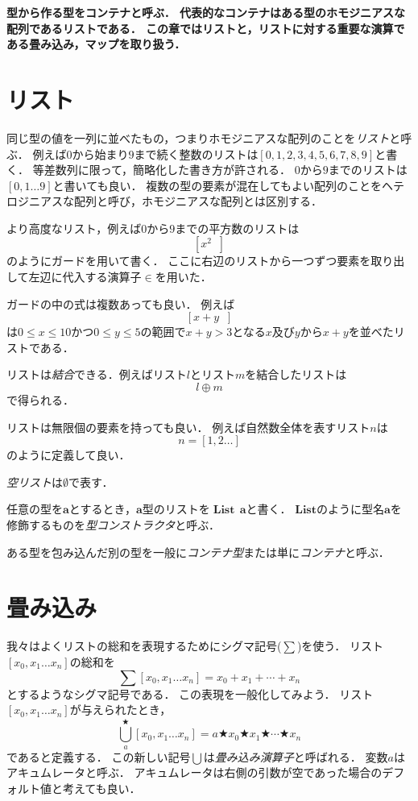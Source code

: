 \documentclass[twocolumn]{jsbook}
\newcommand{\keyword}[1]{\emph{#1}}
\newenvironment{leader}{\begingroup\bf}{\endgroup}
\newcommand{\typename}[1]{\mathbf{#1}}
\newcommand{\typeconstructor}[2]{\mathop{#1}\,#2}
\newcommand{\typelist}{\typename{List}}
\newcommand{\constantempty}{\emptyset}
\newcommand{\binaryg}{>}
\newcommand{\binarylistappend}{\oplus}
\newcommand{\listtype}[1]{\left[#1\right]}
\newcommand{\guard}[1]{\mathop{\mid_{#1}}}
\newcommand{\guardcomma}{,\,}
\newcommand{\isin}{\in}
\newcommand{\rangedots}{\dots}
\newcommand{\infinitydots}{\dots}
\newcommand{\mathbinaryop}{\bigstar}
\newcommand{\mathfold}{\bigcup}
\begin{document}
\begin{leader}
型から作る型をコンテナと呼ぶ．
代表的なコンテナはある型のホモジニアスな配列であるリストである．
この章ではリストと，リストに対する重要な演算である畳み込み，マップを取り扱う．
\end{leader}


\section{リスト}

同じ型の値を一列に並べたもの，つまりホモジニアスな配列のことを\keyword{リスト}と呼ぶ．
例えば$0$から始まり$9$まで続く整数のリストは$\listtype{0,1,2,3,4,5,6,7,8,9}$と書く．
等差数列に限って，簡略化した書き方が許される．
$0$から$9$までのリストは$\listtype{0,1\rangedots9}$と書いても良い．
複数の型の要素が混在してもよい配列のことをヘテロジニアスな配列と呼び，ホモジニアスな配列とは区別する．

より高度なリスト，例えば$0$から$9$までの平方数のリストは$$\listtype{x^2\guard{x\isin\listtype{0,1\rangedots9}}}$$のようにガードを用いて書く．
ここに右辺のリストから一つずつ要素を取り出して左辺に代入する演算子$\isin$を用いた．

ガードの中の式は複数あっても良い．
例えば$$\listtype{x+y\guard{x\isin\listtype{0,1\rangedots9}\guardcomma y\isin\listtype{0,1\rangedots5}\guardcomma x+y\binaryg3}}$$は$0\le x\le 10$かつ$0\le y\le 5$の範囲で$x+y>3$となる$x$及び$y$から$x+y$を並べたリストである．

リストは\keyword{結合}できる．例えばリスト$l$とリスト$m$を結合したリストは$$l\binarylistappend m$$で得られる．

リストは無限個の要素を持っても良い．
例えば自然数全体を表すリスト$n$は$$n=[1,2\infinitydots]$$のように定義して良い．

\keyword{空リスト}は$\constantempty$で表す．

任意の型を$\typename{a}$とするとき，$\typename{a}$型のリストを$\typeconstructor{\typelist}{\typename{a}}$と書く．
$\typelist$のように型名$\typename{a}$を修飾するものを\keyword{型コンストラクタ}と呼ぶ．

ある型を包み込んだ別の型を一般に\keyword{コンテナ型}または単に\keyword{コンテナ}と呼ぶ．

\section{畳み込み}

我々はよくリストの総和を表現するためにシグマ記号($\sum$)を使う．
リスト$\listtype{x_0,x_1\rangedots x_n}$の総和を$$\sum\listtype{x_0,x_1\rangedots x_n}=x_0+x_1+\dotsb+x_n$$とするようなシグマ記号である．
この表現を一般化してみよう．
リスト$\listtype{x_0,x_1\rangedots x_n}$が与えられたとき，$$\mathfold^\mathbinaryop_a\listtype{x_0,x_1\rangedots x_n}=a\mathbinaryop x_0\mathbinaryop x_1\mathbinaryop\dotsb\mathbinaryop x_n$$であると定義する．
この新しい記号$\mathfold$は\keyword{畳み込み演算子}と呼ばれる．
変数$a$はアキュムレータと呼ぶ．
アキュムレータは右側の引数が空であった場合のデフォルト値と考えても良い．
\end{document}
